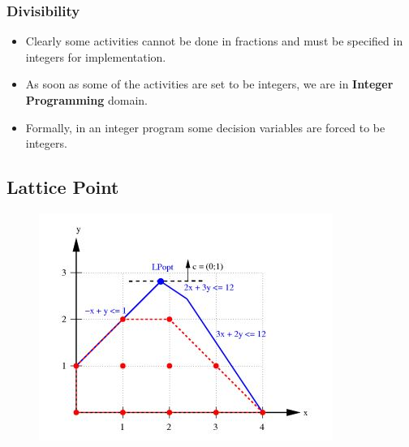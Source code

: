 \documentclass{beamer}
\begin{document}
\begin{frame}
\frametitle{Divisibility}
\begin{itemize}
\item Clearly
some activities cannot be done in fractions and must be specified in integers for implementation.
\item As soon as
 some of the activities are set to be integers, we are in \textbf{Integer Programming} domain. 
 \item Formally, in an integer
 program some decision variables are forced to be integers.
\end{itemize}
\end{frame}
\subsection{Lattice Point}
\begin{frame}
	\begin{figure}
\centering
\includegraphics[width=0.7\linewidth]{LatticePoints}
\caption{}
\label{fig:LatticePoints}
\end{figure}

\end{frame}
\end{document}
